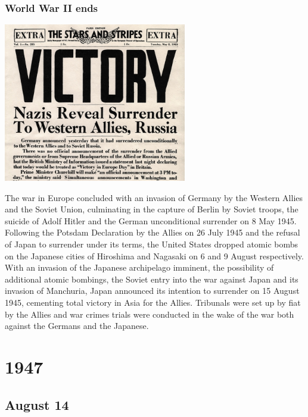 \documentclass[11pt]{report}
\begin{document}
\subsection{World War II ends}
\vspace{2mm}\begin{center}\includegraphics[width=8cm]{./img/endww2.jpg}\end{center}
The war in Europe concluded with an invasion of Germany by the Western Allies and the Soviet Union, culminating in the capture of Berlin by Soviet troops, the suicide of Adolf Hitler and the German unconditional surrender on 8 May 1945. Following the Potsdam Declaration by the Allies on 26 July 1945 and the refusal of Japan to surrender under its terms, the United States dropped atomic bombs on the Japanese cities of Hiroshima and Nagasaki on 6 and 9 August respectively. With an invasion of the Japanese archipelago imminent, the possibility of additional atomic bombings, the Soviet entry into the war against Japan and its invasion of Manchuria, Japan announced its intention to surrender on 15 August 1945, cementing total victory in Asia for the Allies. Tribunals were set up by fiat by the Allies and war crimes trials were conducted in the wake of the war both against the Germans and the Japanese.

\chapter{1947}
\section{August 14}
\end{document}
